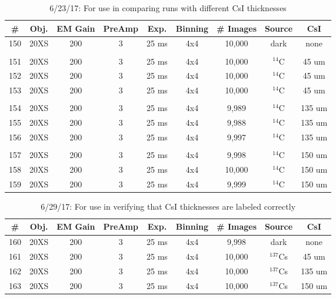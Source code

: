 \documentclass[12pt]{amsart}
\begin{document}
\begin{table}[!htbp]
	\centering
	\caption{6/23/17: For use in comparing runs with different CsI thicknesses}
	\label{tab:table26}
	\hspace*{-1cm}
	\begin{tabular}{ccccccccc}
	\toprule
	\# & Obj. & EM Gain & PreAmp & Exp. & Binning & \# Images & Source & CsI\\
	\midrule
	150 & 20XS & 200 & 3 & 25 ms & 4x4 & 10,000 & dark & none\\
	 & \\
	151 & 20XS & 200 & 3 & 25 ms & 4x4 & 10,000 & $^{14}$C & 45 um\\
	152 & 20XS & 200 & 3 & 25 ms & 4x4 & 10,000 & $^{14}$C & 45 um\\
	153 & 20XS & 200 & 3 & 25 ms & 4x4 & 10,000 & $^{14}$C & 45 um\\
	 &  \\
	154 & 20XS & 200 & 3 & 25 ms & 4x4 & 9,989 & $^{14}$C & 135 um\\
	155 & 20XS & 200 & 3 & 25 ms & 4x4 & 9,988 & $^{14}$C & 135 um\\
	156 & 20XS & 200 & 3 & 25 ms & 4x4 & 9,997 & $^{14}$C & 135 um\\
	 & \\
	 157 & 20XS & 200 & 3 & 25 ms & 4x4 & 9,998 & $^{14}$C & 150 um\\
	 158 & 20XS & 200 & 3 & 25 ms & 4x4 & 10,000 & $^{14}$C & 150 um\\
	 159 & 20XS & 200 & 3 & 25 ms & 4x4 & 9,999 & $^{14}$C & 150 um\\
	\bottomrule
	\end{tabular}
	\hspace*{-1cm}
\end{table}

\begin{table}[!htbp]
	\centering
	\caption{6/29/17: For use in verifying that CsI thicknesses are labeled correctly}
	\label{tab:table27}
	\hspace*{-1cm}
	\begin{tabular}{ccccccccc}
	\toprule
	\# & Obj. & EM Gain & PreAmp & Exp. & Binning & \# Images & Source & CsI\\
	\midrule
	160 & 20XS & 200 & 3 & 25 ms & 4x4 & 9,998 & dark & none\\
	161 & 20XS & 200 & 3 & 25 ms & 4x4 & 10,000 & $^{137}$Cs & 45 um\\
	162 & 20XS & 200 & 3 & 25 ms & 4x4 & 10,000 & $^{137}$Cs & 135 um\\
	163 & 20XS & 200 & 3 & 25 ms & 4x4 & 10,000 & $^{137}$Cs & 150 um\\
	\bottomrule
	\end{tabular}
	\hspace*{-1cm}
\end{table}
\end{document}
